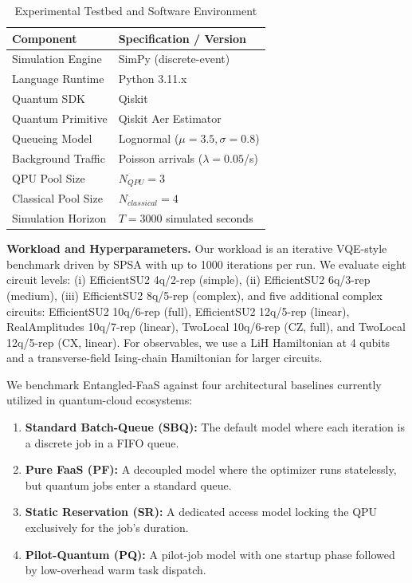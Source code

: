 \documentclass[conference]{IEEEtran}
\begin{document}
\begin{table}[htbp]
\caption{Experimental Testbed and Software Environment}
\label{tab:testbed}
\centering
\begin{tabular}{ll}
\hline
\textbf{Component} & \textbf{Specification / Version} \\ \hline
Simulation Engine & SimPy (discrete-event) \\
Language Runtime & Python 3.11.x \\
Quantum SDK & Qiskit \\
Quantum Primitive & Qiskit Aer Estimator \\
Queueing Model & Lognormal ($\mu=3.5,\sigma=0.8$) \\
Background Traffic & Poisson arrivals ($\lambda=0.05$/s) \\
QPU Pool Size & $N_{QPU}=3$ \\
Classical Pool Size & $N_{classical}=4$ \\
Simulation Horizon & $T=3000$ simulated seconds \\ \hline
\end{tabular}
\end{table}

\textbf{Workload and Hyperparameters.}
Our workload is an iterative VQE-style benchmark driven by SPSA with up to 1000 iterations per run. We evaluate eight circuit levels: (i) EfficientSU2 4q/2-rep (simple), (ii) EfficientSU2 6q/3-rep (medium), (iii) EfficientSU2 8q/5-rep (complex), and five additional complex circuits: EfficientSU2 10q/6-rep (full), EfficientSU2 12q/5-rep (linear), RealAmplitudes 10q/7-rep (linear), TwoLocal 10q/6-rep (CZ, full), and TwoLocal 12q/5-rep (CX, linear). For observables, we use a LiH Hamiltonian at 4 qubits and a transverse-field Ising-chain Hamiltonian for larger circuits.

We benchmark Entangled-FaaS against four architectural baselines currently utilized in quantum-cloud ecosystems:
\begin{enumerate}
    \item \textbf{Standard Batch-Queue (SBQ):} The default model where each iteration is a discrete job in a FIFO queue.
    \item \textbf{Pure FaaS (PF):} A decoupled model where the optimizer runs statelessly, but quantum jobs enter a standard queue.
    \item \textbf{Static Reservation (SR):} A dedicated access model locking the QPU exclusively for the job's duration.
    \item \textbf{Pilot-Quantum (PQ):} A pilot-job model with one startup phase followed by low-overhead warm task dispatch.
\end{enumerate}
\end{document}
